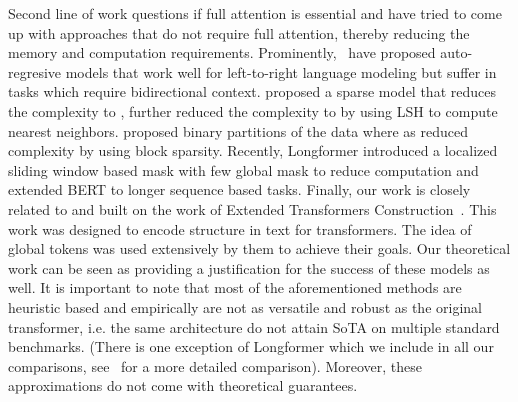 \documentclass{article}
\begin{document}
Second line of work questions if full attention is essential and have tried to come up with approaches that do not require full attention, thereby reducing the memory and computation requirements.
Prominently,~\citet{dai2019transformer, sukhbaatar2019adaptive, rae2019compressive} have proposed auto-regresive models that work well for left-to-right language modeling but suffer in tasks which require bidirectional context.
\citet{child2019generating} proposed a sparse model that reduces the complexity to , \citet{kitaev2019reformer} further reduced the complexity to  by using LSH to compute  nearest neighbors. 
\citet{ye2019bp} proposed binary partitions of the data where as \citet{qiu2019blockwise} reduced complexity by using block sparsity. 
Recently, Longformer \cite{beltagy2020longformer} introduced a localized sliding 
window based mask with few global mask to reduce computation and extended BERT to longer sequence based tasks. 
Finally, our work is closely related to and built on the work of Extended Transformers Construction~\citep{ainslie2020etc}. 
This work was designed to encode structure in text for transformers. The idea of global tokens was used extensively by them to achieve their goals. Our theoretical work can be seen as providing a  justification for the success of these models as well.
It is important to note that most of the aforementioned methods are heuristic based and empirically are not as versatile and robust as the original transformer, i.e. the same architecture do not attain SoTA on multiple standard benchmarks. (There is one exception of Longformer which we include in all our comparisons, see~ for a more detailed comparison). 
Moreover, these approximations do not come with theoretical guarantees. 
\end{document}
